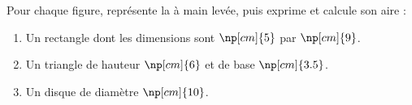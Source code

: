 \documentclass{classe-tex3R}
\begin{document}
\begin{enonce}
Pour chaque figure, représente la à main levée, puis exprime et calcule son aire :

  	\begin{enumerate}[leftmargin=*]
			\item Un rectangle dont les dimensions sont $\np[cm]{5}$ par $\np[cm]{9}$.
			

\dotfill

\medskip

\dotfill

\medskip

\dotfill

\medskip

\dotfill

			
			\item Un triangle de hauteur $\np[cm]{6}$ et de base $\np[cm]{3.5}$.
			      

\dotfill

\medskip

\dotfill

\medskip

\dotfill

\medskip

\dotfill


			\item Un disque de diamètre $\np[cm]{10}$.
			

\dotfill

\medskip

\dotfill

\medskip

\dotfill

\medskip

\dotfill


	\end{enumerate}


\end{enonce}
\end{document}
